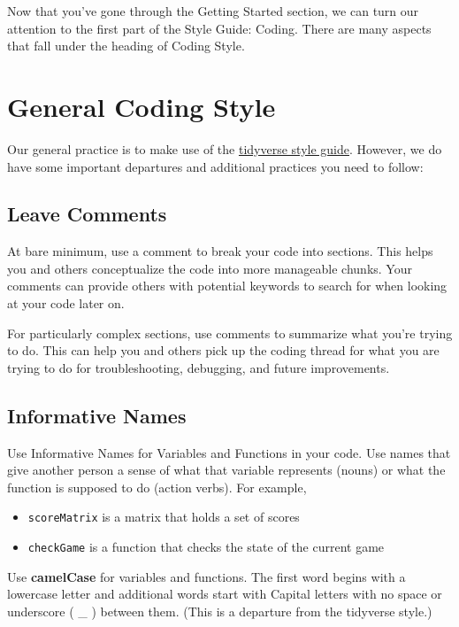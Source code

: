 \documentclass[]{book}
\providecommand{\tightlist}{%
  \setlength{\itemsep}{0pt}\setlength{\parskip}{0pt}}
\begin{document}
Now that you've gone through the Getting Started section, we can turn our attention to the first part of the Style Guide: Coding. There are many aspects that fall under the heading of Coding Style.

\hypertarget{genCode}{%
\section{General Coding Style}\label{genCode}}

Our general practice is to make use of the \href{https://style.tidyverse.org/}{tidyverse style guide}. However, we do have some important departures and additional practices you need to follow:

\hypertarget{comments}{%
\subsection{Leave Comments}\label{comments}}

At bare minimum, use a comment to break your code into sections. This helps you and others conceptualize the code into more manageable chunks. Your comments can provide others with potential keywords to search for when looking at your code later on.

For particularly complex sections, use comments to summarize what you're trying to do. This can help you and others pick up the coding thread for what you are trying to do for troubleshooting, debugging, and future improvements.

\hypertarget{naming}{%
\subsection{Informative Names}\label{naming}}

Use Informative Names for Variables and Functions in your code. Use names that give another person a sense of what that variable represents (nouns) or what the function is supposed to do (action verbs). For example,

\begin{itemize}
\tightlist
\item
  \texttt{scoreMatrix} is a matrix that holds a set of scores\\
\item
  \texttt{checkGame} is a function that checks the state of the current game
\end{itemize}

Use \textbf{camelCase} for variables and functions. The first word begins with a lowercase letter and additional words start with Capital letters with no space or underscore ( \_ ) between them. (This is a departure from the tidyverse style.)
\end{document}
